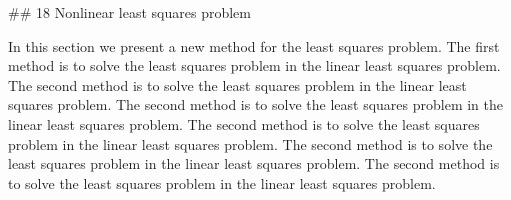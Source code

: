 

## 18 Nonlinear least squares problem

In this section we present a new method for the least squares problem. The first method is to solve the least squares problem in the linear least squares problem. The second method is to solve the least squares problem in the linear least squares problem. The second method is to solve the least squares problem in the linear least squares problem. The second method is to solve the least squares problem in the linear least squares problem. The second method is to solve the least squares problem in the linear least squares problem. The second method is to solve the least squares problem in the linear least squares problem.

